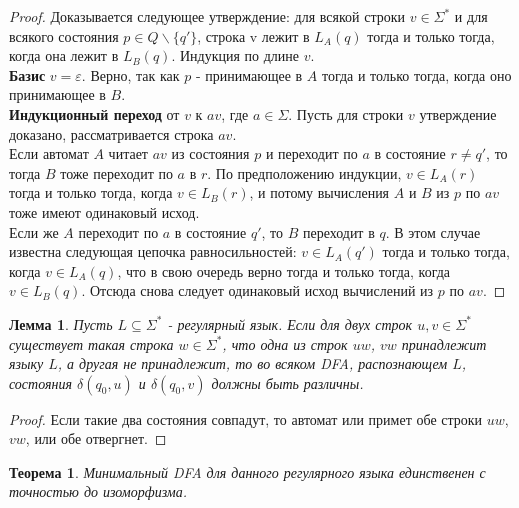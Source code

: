 \documentclass[a4paper]{article}
\theoremstyle{indented}
\newtheorem{theorem}{Теорема}
\newtheorem{lemma}{Лемма}
\theoremstyle{definition}
\theoremstyle{remark}
\begin{document}
\begin{proof}
    Доказывается следующее утверждение: для всякой строки $v \in \Sigma^*$ и для всякого состояния $p \in Q \backslash \{q'\}$, строка v лежит в $L_A(q)$ тогда и только тогда, когда она лежит в $L_B(q)$. Индукция по длине $v$. \\ 

    \textbf{Базис} $v = \varepsilon$. Верно, так как $p$ - принимающее в $A$ тогда и только тогда, когда оно принимающее в $B$. \\ 

    \textbf{Индукционный переход} от $v$ к $av$, где $a \in \Sigma$. Пусть для строки $v$ утверждение доказано, рассматривается строка $av$. \\ 

    Если автомат $A$ читает $av$ из состояния $p$ и переходит по $a$ в состояние $r\neq q'$, то тогда $B$ тоже переходит по $a$ в $r$. По предположению индукции, $v \in L_A(r)$ тогда и только тогда, когда $v \in L_B(r)$, и потому вычисления $A$ и $B$ из $p$ по $av$ тоже имеют одинаковый исход. \\ 

    Если же $A$ переходит по $a$ в состояние $q'$, то $B$ переходит в $q$. В этом случае известна следующая цепочка равносильностей: $v \in L_A(q')$ тогда и только тогда, когда $v \in L_A(q)$, что в свою очередь верно тогда и только тогда, когда $v \in L_B(q)$. Отсюда снова следует одинаковый исход вычислений из $p$ по $av$.
\end{proof}

\begin{lemma}
    Пусть $L \subseteq \Sigma^*$ - регулярный язык. Если для двух строк $u, v \in \Sigma^*$ существует такая строка $w \in \Sigma^*$, что одна из строк $uw$, $vw$ принадлежит языку $L$, а другая не принадлежит, то во всяком DFA, распознающем $L$, состояния $\delta(q_0,u)$ и $\delta(q_0,v)$ должны быть различны.
\end{lemma}

\begin{proof}
    Если такие два состояния совпадут, то автомат или примет обе строки $uw$, $vw$, или обе отвергнет.
\end{proof}

\begin{theorem}
    Минимальный DFA для данного регулярного языка единственен с точностью до изоморфизма.
\end{theorem}
\end{document}

